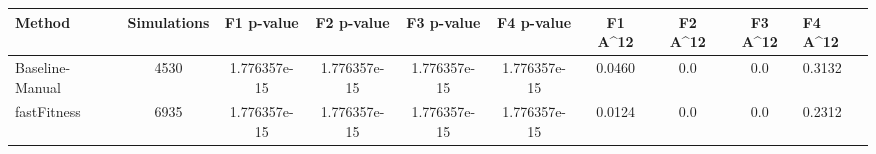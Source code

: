 \begin{tabular}{lcccccccc}
\toprule
         Method &  Simulations &   F1 p-value &   F2 p-value &   F3 p-value &   F4 p-value &  F1 A^12 &  F2 A^12 &  F3 A^12 &  F4 A^12 \\
\midrule
Baseline-Manual &         4530 & 1.776357e-15 & 1.776357e-15 & 1.776357e-15 & 1.776357e-15 &   0.0460 &      0.0 &      0.0 &   0.3132 \\
    fastFitness &         6935 & 1.776357e-15 & 1.776357e-15 & 1.776357e-15 & 1.776357e-15 &   0.0124 &      0.0 &      0.0 &   0.2312 \\
\bottomrule
\end{tabular}
